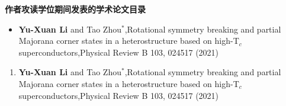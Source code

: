 \begin{center}
	\bf 作者攻读学位期间发表的学术论文目录
\end{center}

\begin{itemize}
	\item {\bf Yu-Xuan Li} and Tao Zhou$^{*}$,Rotational symmetry breaking and partial Majorana corner states in a heterostructure
	based on high-T$_c$ superconductors,Physical Review B 103, 024517 (2021)
\end{itemize}

\begin{enumerate}
	\item {\bf Yu-Xuan Li} and Tao Zhou$^{*}$,Rotational symmetry breaking and partial Majorana corner states in a heterostructure
	based on high-T$_c$ superconductors,Physical Review B 103, 024517 (2021)
\end{enumerate}